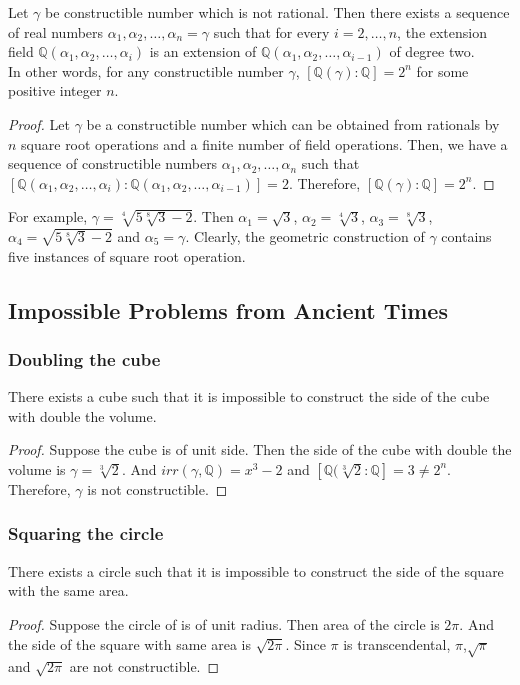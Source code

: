 \begin{corollary}
	Let $\gamma$ be constructible number which is not rational.
	Then there exists a sequence of real numbers $\alpha_1,\alpha_2,\dots,\alpha_n = \gamma$ such that for every $i = 2,\dots,n$, the extension field $\mathbb{Q}(\alpha_1,\alpha_2,\dots,\alpha_i)$ is an extension of $\mathbb{Q}(\alpha_1,\alpha_2,\dots,\alpha_{i-1})$ of degree two.\\


	In other words, for any constructible number $\gamma$, $[\mathbb{Q}(\gamma) : \mathbb{Q}] = 2^n$ for some positive integer $n$.
\end{corollary}
\begin{proof}
	Let $\gamma$ be a constructible number which can be obtained from rationals by $n$ square root operations and a finite number of field operations.
	Then, we have a sequence of constructible numbers $\alpha_1, \alpha_2,\dots, \alpha_n$ such that $[\mathbb{Q}(\alpha_1,\alpha_2,\dots,\alpha_i) : \mathbb{Q}(\alpha_1,\alpha_2,\dots,\alpha_{i-1})] = 2$.
	Therefore, $[\mathbb{Q}(\gamma) : \mathbb{Q}] = 2^n$.
\end{proof}

	For example, $\gamma = \sqrt[4]{5\sqrt[8]{3}-2}$.
	Then $\alpha_1 = \sqrt{3}$, $\alpha_2 = \sqrt[4]{3}$, $\alpha_3= \sqrt[8]{3}$, $\alpha_4 = \sqrt{5\sqrt[8]{3}-2}$ and $\alpha_5 = \gamma$.
	Clearly, the geometric construction of $\gamma$ contains five instances of square root operation.

\subsection{Impossible Problems from Ancient Times}
\subsubsection{Doubling the cube}
\begin{theorem}
	There exists a cube such that it is impossible to construct the side of the cube with double the volume.
\end{theorem}
\begin{proof}
	Suppose the cube is of unit side.
	Then the side of the cube with double the volume is $\gamma = \sqrt[3]{2}$.
	And $irr(\gamma,\mathbb{Q}) = x^3-2$ and $[\mathbb{Q}(\sqrt[3]{2}:\mathbb{Q}] = 3 \ne 2^n$.
	Therefore, $\gamma$ is not constructible.
\end{proof}
\subsubsection{Squaring the circle}
\begin{theorem}
	There exists a circle such that it is impossible to construct the side of the square with the same area.
\end{theorem}
\begin{proof}
	Suppose the circle of is of unit radius.
	Then area of the circle is $2\pi$.
	And the side of the square with same area is $\sqrt{2\pi}$.
	Since $\pi$ is transcendental, $\pi$,$\sqrt{\pi}$ and $\sqrt{2\pi}$ are not constructible.
\end{proof}
